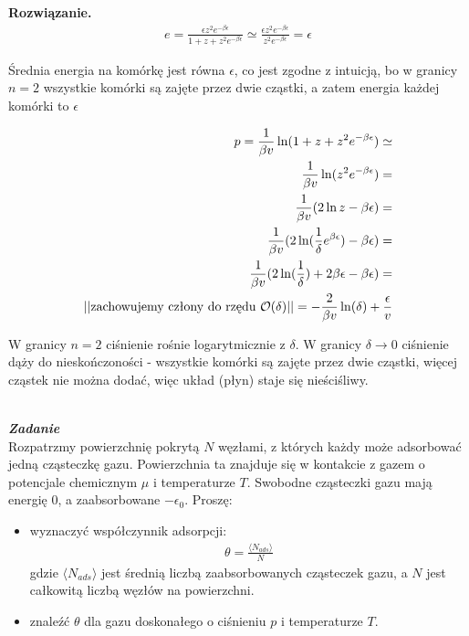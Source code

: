 \documentclass[11pt,a4paper]{article}
\newcounter{zadanie}\newcommand{\zadanie}[1][]{\addtocounter{zadanie}{1} ~\\ {\bf \emph{Zadanie \arabic{zadanie} #1 }} \\}
\newenvironment{solution}{\vspace{1cm} \par\textbf{Rozwiązanie.} \vspace{1cm}}{}
\begin{document}
\begin{solution}
\begin{align*}
  e = \frac{\epsilon z^2 e^{-\beta \epsilon}}{1 + z + z^2 e^{-\beta \epsilon}} \simeq
  \frac{\epsilon z^2 e^{-\beta \epsilon}}{z^2 e^{-\beta \epsilon}} = \epsilon
\end{align*}

Średnia energia na komórkę jest równa $\epsilon$, co jest zgodne z intuicją,
bo w granicy $n=2$ wszystkie komórki są zajęte przez dwie cząstki, a zatem 
energia każdej komórki to $\epsilon$


\begin{align*}
  p = \frac{1}{\beta v} \ln (1 + z + z^2 e^{-\beta \epsilon}) \simeq \\
  \frac{1}{\beta v} \ln (z^2 e^{-\beta \epsilon}) = \\
  \frac{1}{\beta v} (2 \ln z - \beta \epsilon) = \\
  \frac{1}{\beta v} (2 \ln (\frac{1}{\delta} e^{\beta \epsilon}) - \beta \epsilon) = \\
  \frac{1}{\beta v} (2 \ln (\frac{1}{\delta}) + 2 \beta \epsilon - \beta \epsilon) = \\
  ||\text{zachowujemy człony do rzędu}~{\cal O}(\delta)|| =
  -\frac{2}{\beta v} \ln (\delta) + \frac{\epsilon}{v}
\end{align*}

W granicy $n=2$ ciśnienie rośnie logarytmicznie z $\delta$. W granicy 
$ \delta \to 0$ ciśnienie dąży do nieskończoności - wszystkie komórki są zajęte 
przez dwie cząstki, więcej cząstek nie można dodać, więc układ (płyn) staje się 
nieściśliwy.

\newpage   
\end{solution}
\zadanie[]

Rozpatrzmy powierzchnię pokrytą $N$ węzłami, z których każdy może adsorbować
jedną cząsteczkę gazu. Powierzchnia ta znajduje się w kontakcie 
z gazem o potencjale chemicznym $\mu$ i temperaturze $T$. 
Swobodne cząsteczki gazu mają energię $0$, a zaabsorbowane $-\epsilon_0$.
Proszę: 
\begin{itemize} 
  \item  wyznaczyć współczynnik adsorpcji:
\begin{align*}
  \theta = \frac{\langle N_{ads} \rangle}{N}
\end{align*}
gdzie $\langle N_{ads} \rangle$ jest średnią liczbą zaabsorbowanych cząsteczek gazu,
 a $N$ jest całkowitą liczbą węzłów na powierzchni.
\item znaleźć $\theta$ dla gazu doskonałego o ciśnieniu $p$ i temperaturze $T$.
\end{itemize}
\end{document}

